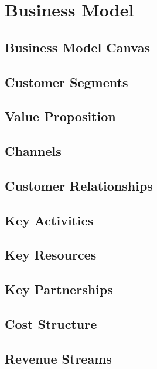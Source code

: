 \section{Business Model}
\label{sec:business_model}

\subsection{Business Model Canvas}

\subsection{Customer Segments}

\subsection{Value Proposition}

\subsection{Channels}

\subsection{Customer Relationships}

\subsection{Key Activities}

\subsection{Key Resources}

\subsection{Key Partnerships}

\subsection{Cost Structure}

\subsection{Revenue Streams}


